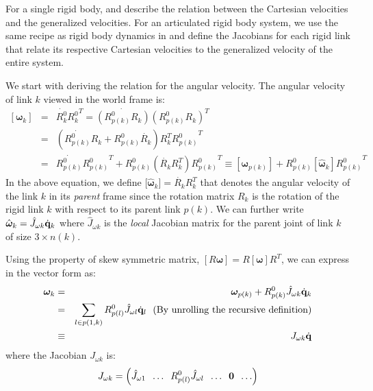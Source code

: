For a single rigid body,  and  describe the relation between the Cartesian velocities and the generalized velocities. 
For an articulated rigid body system, we use the same recipe as rigid body dynamics in  and define the Jacobians for each rigid link that relate its respective Cartesian velocities to the generalized velocity of the entire system. 

We start with deriving the relation for the angular velocity. The angular velocity of link $k$ viewed in the world frame is:
\begin{eqnarray}
\nonumber
[\bm{\omega}_k] & = & \dot{R^0_k} {R^0_k}^T = \dot{(R^0_{p(k)}R_k)} (R^0_{p(k)}R_k)^T\\
\nonumber
& = & (\dot{R^0_{p(k)}}R_k + {R^0_{p(k)}}\dot{R_k})  R_k^T {R^0_{p(k)}}^T \\
\label{eq:angvelk_recursive}
& = & \dot{R^0_{p(k)}}{R^0_{p(k)}}^T + R^0_{p(k)} \left ( \dot{R_k} R_k^T \right ) {R^0_{p(k)}}^T \equiv [\bm{\omega}_{p(k)}] + R^0_{p(k)} [\hat{\bm{\omega}}_k] {R^0_{p(k)}}^T
\end{eqnarray}
In the above equation, we define [$\hat{\bm{\omega}}_k] = \dot{R_k} R_k^T$ that denotes the angular velocity of the link $k$ in its \emph{parent} frame since the rotation matrix $R_k$ is the rotation of the rigid link $k$ with respect to its parent link $p(k)$. We can further write $\hat{\bm{\omega}}_k = \hat{J}_{\omega k} \dot{\mathbf{q}}_k$ where $\hat{J}_{\omega k}$ is the \emph{local} Jacobian matrix for the parent joint of link $k$ of size $3\times n(k)$. 

Using the property of skew symmetric matrix, $[R \bm{\omega}] = R [\bm{\omega}]
R^T$, we can express  in the vector form as:
\begin{eqnarray}
\label{eq:angvelk_iterative}
\nonumber
\bm{\omega}_k & = & \bm{\omega}_{p(k)} + R^0_{p(k)} \hat{J}_{\omega k} \dot{\mathbf{q}}_k\\
\nonumber
& = & \sum_{l \in p(1,k)} R^0_{p(l)} \hat{J}_{\omega l} \dot{\mathbf{q}}_l \mbox{\ \ (By unrolling the recursive definition)}\\
& \equiv & J_{\omega k}\dot{\mathbf{q}}
\end{eqnarray}
where the Jacobian $J_{\omega k}$ is:
\begin{equation}
\label{eq:angular_velocity_jac_link}
J_{\omega k} = \left ( \hat{J}_{\omega 1}\;\; \hdots\;\; R^0_{p(l)} \hat{J}_{\omega l} \;\;\hdots\;\; \mathbf{0} \;\;\hdots \right )
\end{equation}

